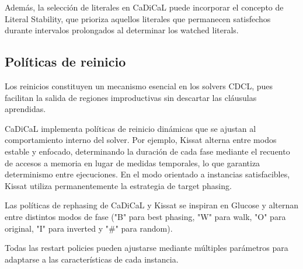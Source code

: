 Además, la selección de literales en CaDiCaL puede incorporar el concepto de Literal Stability, que prioriza aquellos literales que permanecen satisfechos durante intervalos prolongados al determinar los watched literals. %

\subsection{Políticas de reinicio}
Los reinicios constituyen un mecanismo esencial en los solvers CDCL, pues facilitan la salida de regiones improductivas sin descartar las cláusulas aprendidas. %

CaDiCaL implementa políticas de reinicio dinámicas que se ajustan al comportamiento interno del solver. %
Por ejemplo, Kissat alterna entre modos estable y enfocado, determinando la duración de cada fase mediante el recuento de accesos a memoria en lugar de medidas temporales, lo que garantiza determinismo entre ejecuciones. %
En el modo orientado a instancias satisfacibles, Kissat utiliza permanentemente la estrategia de target phasing. %

Las políticas de rephasing de CaDiCaL y Kissat se inspiran en Glucose y alternan entre distintos modos de fase ("B" para best phasing, "W" para walk, "O" para original, "I" para inverted y "\#" para random). %

Todas las restart policies pueden ajustarse mediante múltiples parámetros para adaptarse a las características de cada instancia. %



